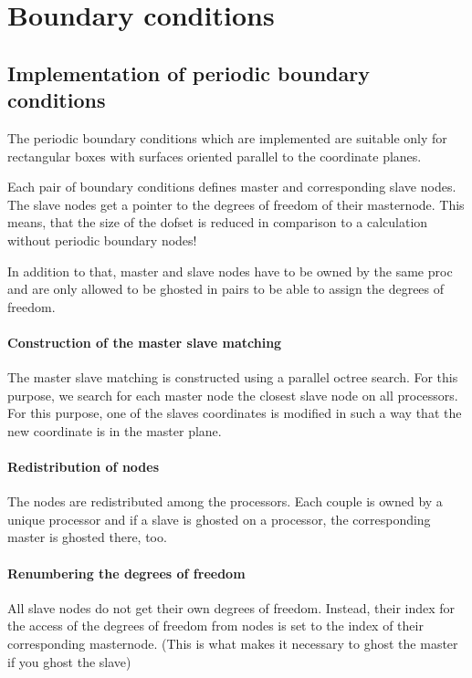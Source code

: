 \chapter{Boundary conditions}



\section{Implementation of periodic boundary conditions}

The periodic boundary conditions which are implemented are suitable only for
rectangular boxes with surfaces oriented parallel to the coordinate planes.

Each pair of boundary conditions defines master and corresponding slave
nodes. The slave nodes get a pointer to the degrees of freedom of their
masternode. This means, that the size of the dofset is reduced in comparison
to a calculation without periodic boundary nodes!

In addition to that, master and slave nodes have to be owned by the same proc
and are only allowed to be ghosted in pairs to be able to assign the degrees
of freedom.

\subsubsection{Construction of the master slave matching}
The master slave matching is constructed using a parallel octree search. For
this purpose, we search for each master node the closest slave node on all
processors. For this purpose, one of the slaves coordinates is modified
in such a way that the new coordinate is in the master plane.

\subsubsection{Redistribution of nodes}
The nodes are redistributed among the processors. Each couple is owned by a
unique processor and if a slave is ghosted on a processor, the corresponding
master is ghosted there, too.

\subsubsection{Renumbering the degrees of freedom}
All slave nodes do not get their own degrees of freedom. Instead, their index
for the access of the degrees of freedom from nodes is set to the index of
their corresponding masternode. (This is what makes it necessary to ghost the
master if you ghost the slave)

